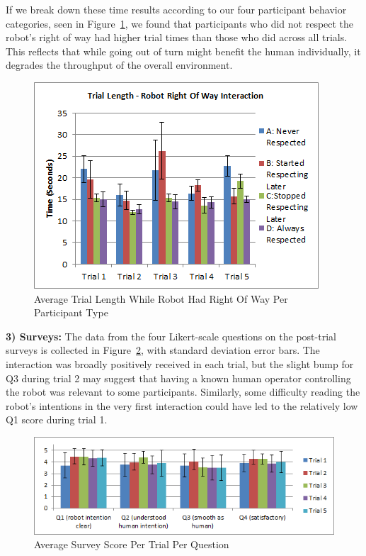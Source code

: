 \documentclass[letterpaper, 10 pt, conference]{ieeeconf}  %
\begin{document}
If we break down these time results according to our four participant behavior categories, seen in Figure~\ref{fig:Respect}, we found that participants who did not respect the robot's right of way had higher trial times than those who did across all trials. This reflects that while going out of turn might benefit the human individually, it degrades the throughput of the overall environment. 

     \begin{figure}
      \centering
      \includegraphics{Robot_right.png}
      \caption{Average Trial Length While Robot Had Right Of Way Per Participant Type}
      \label{fig:Respect}
   \end{figure}

\textbf{3) Surveys:} The data from the four Likert-scale questions on the post-trial surveys is collected in Figure~\ref{fig:Questionnaire}, with standard deviation error bars. The interaction was broadly positively received in each trial, but the slight bump for Q3 during trial 2 may suggest that having a known human operator controlling the robot was relevant to some participants. Similarly, some difficulty reading the robot's intentions in the very first interaction could have led to the relatively low Q1 score during trial 1.
 
     \begin{figure}
      \centering
      \includegraphics[width=\textwidth]{Questionnaire.png}
      \caption{Average Survey Score Per Trial Per Question }
      \label{fig:Questionnaire}
   \end{figure}
 
\end{document}
